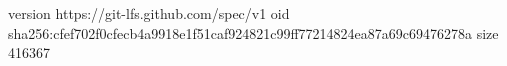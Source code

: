 version https://git-lfs.github.com/spec/v1
oid sha256:cfef702f0cfecb4a9918e1f51caf924821c99ff77214824ea87a69c69476278a
size 416367
